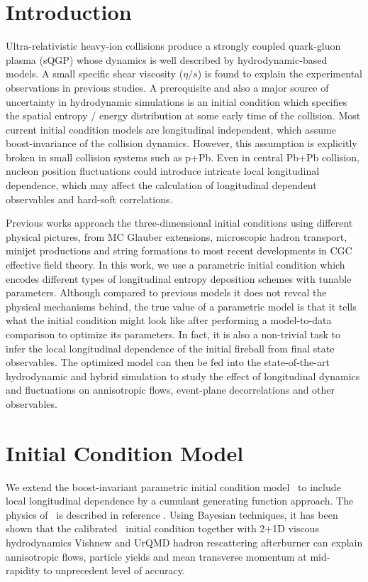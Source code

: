 \documentclass[3p,times,twocolumn]{elsarticle}
\begin{document}

\section{Introduction}
\label{Introduction}
Ultra-relativistic heavy-ion collisions produce a strongly coupled quark-gluon plasma (sQGP) whose dynamics is well described by hydrodynamic-based models.
A small specific shear viscosity ($\eta/s$) is found to explain the experimental observations in previous studies.
A prerequisite and also a major source of uncertainty in hydrodynamic simulations is an initial condition which specifies the spatial entropy / energy distribution at some early time of the collision.
Most current initial condition models are longitudinal independent, which assume boost-invariance of the collision dynamics.
However, this assumption is explicitly broken in small collision systems such as p+Pb.
Even in central Pb+Pb collision, nucleon position fluctuations could introduce intricate local longitudinal dependence, which may affect the calculation of longitudinal dependent observables and hard-soft correlations.

Previous works approach the three-dimensional initial conditions using different physical pictures, from MC Glauber extensions, microscopic hadron transport, minijet productions and string formations to most recent developments in CGC effective field theory.
In this work, we use a parametric initial condition which encodes different types of longitudinal entropy deposition schemes with tunable parameters.
Although compared to previous models it does not reveal the physical mechanisms behind, the true value of a parametric model is that it tells what the initial condition might look like after performing a model-to-data comparison to optimize its parameters.
In fact, it is also a non-trivial task to infer the local longitudinal dependence of the initial fireball from final state observables.
The optimized model can then be fed into the state-of-the-art hydrodynamic and hybrid simulation to study the effect of longitudinal dynamics and fluctuations on annisotropic flows, event-plane decorrelations and other observables.

\section{Initial Condition Model}
\label{Model}
We extend the boost-invariant parametric initial condition model \trento~to include local longitudinal dependence by a cumulant generating function approach.
The physics of \trento~is described in reference \cite{Moreland:2014oya}. 
Using Bayesian techniques, it has been shown that the calibrated \trento~initial condition together with 2+1D viscous hydrodynamics Vishnew and UrQMD hadron rescattering afterburner can explain annisotropic flows, particle yields and mean transverse momentum at mid-rapidity to unprecedent level of accuracy.
\end{document}
